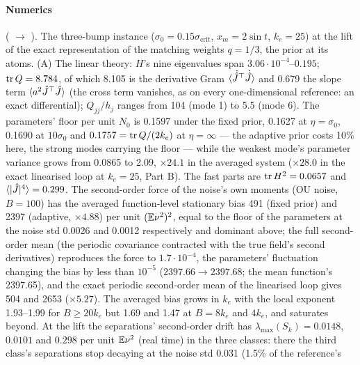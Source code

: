 \begin{sloppypar}
\paragraph{Numerics} ( $\to$ ). The
three-bump instance ($\sigma_0 = 0.15\sigma_{\mathrm{crit}}$, $x_m = 2\sin t$, $k_e = 25$) at the lift of the exact
representation of the matching weights $q = 1/3$, the prior at its atoms. (A) The linear theory: $H$'s nine eigenvalues
span $3.06\cdot10^{-4}$--$0.195$; $\operatorname{tr} Q = 8.784$, of which 8.105 is the derivative Gram
$\langle\dot{\hat J}^\top\dot{\hat J}\rangle$ and 0.679 the slope term $\langle a^2\hat J^\top\hat J\rangle$ (the cross
term vanishes, as on every one-dimensional reference: an exact differential); $Q_{jj}/h_j$ ranges from 104 (mode 1) to
5.5 (mode 6). The parameters' floor per unit $N_0$ is 0.1597 under the fixed prior, 0.1627 at $\eta = \sigma_0$,
0.1690 at $10\sigma_0$ and $0.1757 = \operatorname{tr} Q/(2k_e)$ at $\eta = \infty$ --- the adaptive prior costs 10\% here, the
strong modes carrying the floor --- while the weakest mode's parameter variance grows from 0.0865 to 2.09,
$\times24.1$ in the averaged system ($\times28.0$ in the exact linearised loop at $k_e = 25$, Part B). The fast parts
are $\operatorname{tr} H^2 = 0.0657$ and $\langle\lvert \hat J\rvert^4\rangle = 0.299$. The second-order force of the noise's own moments
(OU noise, $B = 100$) has the averaged function-level stationary bias 491 (fixed prior) and 2397 (adaptive,
$\times4.88$) per unit $(\mathbb{E}\nu^2)^2$, equal to the floor of the parameters at the noise std 0.0026 and 0.0012
respectively and dominant above; the full second-order mean (the periodic covariance contracted with the true field's
second derivatives) reproduces the force to $1.7\cdot10^{-4}$, the parameters' fluctuation changing the bias by less
than $10^{-5}$ ($2397.66\to2397.68$; the mean function's 2397.65), and the exact periodic second-order mean of the
linearised loop gives 504 and 2653 ($\times5.27$). The averaged bias grows in $k_e$ with the local exponent 1.93--1.99
for $B\ge20k_e$ but 1.69 and 1.47 at $B = 8k_e$ and $4k_e$, and saturates beyond. At the lift the separations'
second-order drift has $\lambda_{\max}(S_k) = 0.0148$, $0.0101$ and $0.298$ per unit $\mathbb{E}\nu^2$ (real time) in the
three classes: there the third class's separations stop decaying at the noise std 0.031 (1.5\% of the reference's

\end{sloppypar}
